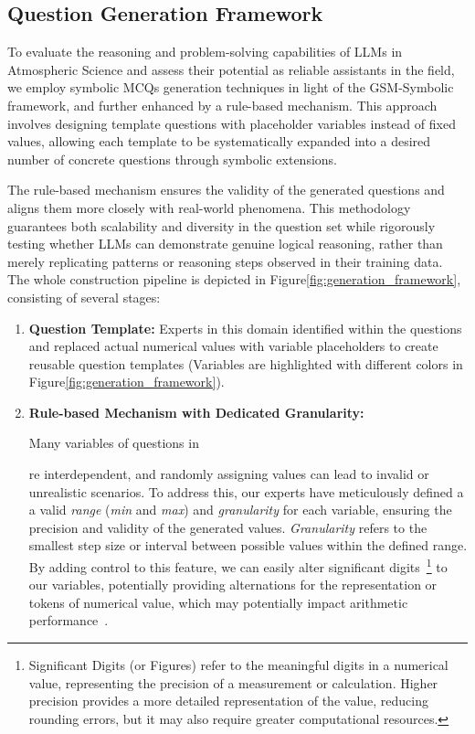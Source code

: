 \subsection{Question Generation Framework}
\label{sec:template_based_question_generation_framework}

\iffalse
{
To evaluate the reasoning and problem-solving capabilities of LLMs in Atmospheric Science and assess their potential as reliable assistants in the field, we employ symbolic MCQs generation techniques in light of the GSM-Symbolic framework, and further enhanced by a rule-based mechanism. This approach involves designing template questions with placeholder variables instead of fixed values, allowing each template to be systematically expanded into a desired number of concrete questions through symbolic extensions. 

The rule-based mechanism ensures the validity of the generated questions and aligns them more closely with real-world phenomena. This methodology guarantees both scalability and diversity in the question set while rigorously testing whether LLMs can demonstrate genuine logical reasoning, rather than merely replicating patterns or reasoning steps observed in their training data. The whole construction pipeline is depicted in Figure\ref{fig:generation_framework}, consisting of several stages:
\vspace{-0.1em}
\begin{enumerate}[topsep=5pt, leftmargin=1em]
    \item \textbf{Question Template:} Experts in this domain identified within the questions and replaced actual numerical values with variable placeholders to create reusable question templates (Variables are highlighted with different colors in Figure\ref{fig:generation_framework}).


    \item \textbf{Rule-based Mechanism with Dedicated Granularity:} 
    
    Many variables of questions in \subject are interdependent, and randomly assigning values can lead to invalid or unrealistic scenarios. 
    To address this, our experts have meticulously defined a a valid \textit{range} (\textit{min} and \textit{max}) and \textit{granularity} for each variable, ensuring the precision and validity of the generated values. \textit{Granularity} refers to the smallest step size or interval between possible values within the defined range. By adding control to this feature, we can easily alter significant digits~\footnote{Significant Digits (or Figures) refer to the meaningful digits in a numerical value, representing the precision of a measurement or calculation. Higher precision provides a more detailed representation of the value, reducing rounding errors, but it may also require greater computational resources.} to our variables, potentially providing alternations for the representation or tokens of numerical value, which may potentially impact arithmetic performance~\cite{schwartz2024numerologic, yang2024number, singh2024tokenization}. 
    

\end{enumerate}}
